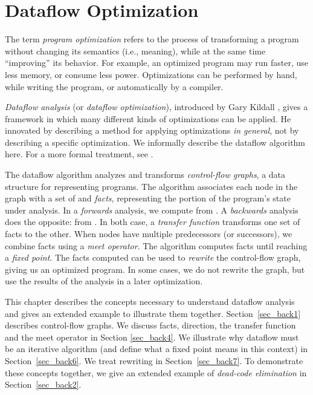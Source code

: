 \documentclass[12pt]{report}
\begin{document}

\renewcommand{\textfraction}{0.1}
\renewcommand{\topfraction}{0.9}

\chapter{Dataflow Optimization}
\label{ref_chapter_background}


The term \emph{program optimization} refers to the process of
transforming a program without changing its semantics (i.e., meaning),
while at the same time ``improving'' its behavior.  For example, an
optimized program may run faster, use less memory, or consume less
power.  Optimizations can be performed by hand, while writing the
program, or automatically by a compiler.

\emph{Dataflow analysis} (or \emph{dataflow optimization}), introduced
by Gary Kildall \citep{Kildall1973}, gives a framework in which many
different kinds of optimizations can be applied. He innovated by
describing a method for applying optimizations \emph{in general}, not
by describing a specific optimization.  We informally describe the
dataflow algorithm here. For a more formal treatment, see
\citep{AhoXX}.

The dataflow algorithm analyzes and transforms \emph{control-flow
  graphs}, a data structure for representing programs. The algorithm
associates each node in the graph with a set of \inE and \out
\emph{facts}, representing the portion of the program's state under
analysis. In a \emph{forwards} analysis, we compute \out from \inE. A
\emph{backwards} analysis does the opposite: \inE from \out.  In both
case, a \emph{transfer function} transforms one set of facts to the
other. When nodes have multiple predecessors (or successors), we
combine facts using a \emph{meet operator}. The algorithm computes
facts until reaching a \emph{fixed point}. The facts computed can be
used to \emph{rewrite} the control-flow graph, giving us an optimized
program. In some cases, we do not rewrite the graph, but use the
results of the analysis in a later optimization.

This chapter describes the concepts necessary to understand dataflow
analysis and gives an extended example to illustrate them
together. Section~\ref{sec_back1} describes control-flow graphs. We
discuss facts, direction, the transfer function and the meet operator
in Section \ref{sec_back4}. We illustrate why dataflow must be an
iterative algorithm (and define what a fixed point means in this
context) in Section~\ref{sec_back6}. We treat rewriting in
Section~\ref{sec_back7}. To demonstrate these concepts together, we
give an extended example of \emph{dead-code elimination} in
Section~\ref{sec_back2}.
\end{document}
